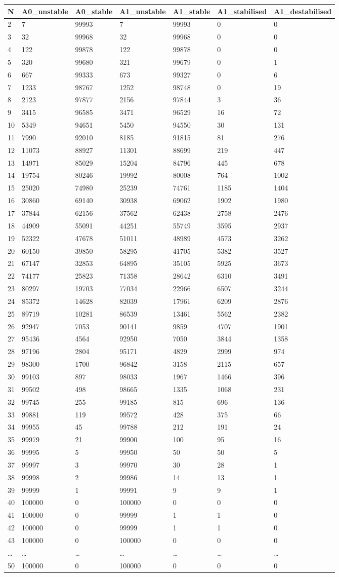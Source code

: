 \documentclass[]{article}
\begin{document}
\begin{longtable}[]{@{}lllllll@{}}
\toprule
N & A0\_unstable & A0\_stable & A1\_unstable & A1\_stable &
A1\_stabilised & A1\_destabilised\tabularnewline
\midrule
\endhead
2 & 7 & 99993 & 7 & 99993 & 0 & 0\tabularnewline
3 & 32 & 99968 & 32 & 99968 & 0 & 0\tabularnewline
4 & 122 & 99878 & 122 & 99878 & 0 & 0\tabularnewline
5 & 320 & 99680 & 321 & 99679 & 0 & 1\tabularnewline
6 & 667 & 99333 & 673 & 99327 & 0 & 6\tabularnewline
7 & 1233 & 98767 & 1252 & 98748 & 0 & 19\tabularnewline
8 & 2123 & 97877 & 2156 & 97844 & 3 & 36\tabularnewline
9 & 3415 & 96585 & 3471 & 96529 & 16 & 72\tabularnewline
10 & 5349 & 94651 & 5450 & 94550 & 30 & 131\tabularnewline
11 & 7990 & 92010 & 8185 & 91815 & 81 & 276\tabularnewline
12 & 11073 & 88927 & 11301 & 88699 & 219 & 447\tabularnewline
13 & 14971 & 85029 & 15204 & 84796 & 445 & 678\tabularnewline
14 & 19754 & 80246 & 19992 & 80008 & 764 & 1002\tabularnewline
15 & 25020 & 74980 & 25239 & 74761 & 1185 & 1404\tabularnewline
16 & 30860 & 69140 & 30938 & 69062 & 1902 & 1980\tabularnewline
17 & 37844 & 62156 & 37562 & 62438 & 2758 & 2476\tabularnewline
18 & 44909 & 55091 & 44251 & 55749 & 3595 & 2937\tabularnewline
19 & 52322 & 47678 & 51011 & 48989 & 4573 & 3262\tabularnewline
20 & 60150 & 39850 & 58295 & 41705 & 5382 & 3527\tabularnewline
21 & 67147 & 32853 & 64895 & 35105 & 5925 & 3673\tabularnewline
22 & 74177 & 25823 & 71358 & 28642 & 6310 & 3491\tabularnewline
23 & 80297 & 19703 & 77034 & 22966 & 6507 & 3244\tabularnewline
24 & 85372 & 14628 & 82039 & 17961 & 6209 & 2876\tabularnewline
25 & 89719 & 10281 & 86539 & 13461 & 5562 & 2382\tabularnewline
26 & 92947 & 7053 & 90141 & 9859 & 4707 & 1901\tabularnewline
27 & 95436 & 4564 & 92950 & 7050 & 3844 & 1358\tabularnewline
28 & 97196 & 2804 & 95171 & 4829 & 2999 & 974\tabularnewline
29 & 98300 & 1700 & 96842 & 3158 & 2115 & 657\tabularnewline
30 & 99103 & 897 & 98033 & 1967 & 1466 & 396\tabularnewline
31 & 99502 & 498 & 98665 & 1335 & 1068 & 231\tabularnewline
32 & 99745 & 255 & 99185 & 815 & 696 & 136\tabularnewline
33 & 99881 & 119 & 99572 & 428 & 375 & 66\tabularnewline
34 & 99955 & 45 & 99788 & 212 & 191 & 24\tabularnewline
35 & 99979 & 21 & 99900 & 100 & 95 & 16\tabularnewline
36 & 99995 & 5 & 99950 & 50 & 50 & 5\tabularnewline
37 & 99997 & 3 & 99970 & 30 & 28 & 1\tabularnewline
38 & 99998 & 2 & 99986 & 14 & 13 & 1\tabularnewline
39 & 99999 & 1 & 99991 & 9 & 9 & 1\tabularnewline
40 & 100000 & 0 & 100000 & 0 & 0 & 0\tabularnewline
41 & 100000 & 0 & 99999 & 1 & 1 & 0\tabularnewline
42 & 100000 & 0 & 99999 & 1 & 1 & 0\tabularnewline
43 & 100000 & 0 & 100000 & 0 & 0 & 0\tabularnewline
\ldots{} & \ldots{} & \ldots{} & \ldots{} & \ldots{} & \ldots{} &
\ldots{}\tabularnewline
50 & 100000 & 0 & 100000 & 0 & 0 & 0\tabularnewline
\bottomrule
\end{longtable}
\end{document}
